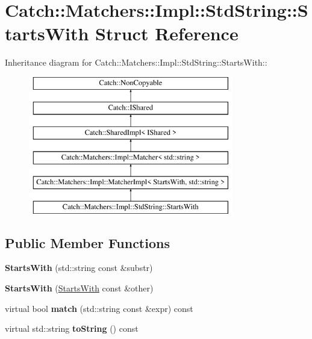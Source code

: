 \hypertarget{structCatch_1_1Matchers_1_1Impl_1_1StdString_1_1StartsWith}{
\section{Catch::Matchers::Impl::StdString::StartsWith Struct Reference}
\label{structCatch_1_1Matchers_1_1Impl_1_1StdString_1_1StartsWith}
}
Inheritance diagram for Catch::Matchers::Impl::StdString::StartsWith::\begin{figure}[H]
\begin{center}
\leavevmode
\includegraphics[height=6cm]{structCatch_1_1Matchers_1_1Impl_1_1StdString_1_1StartsWith}
\end{center}
\end{figure}
\subsection*{Public Member Functions}
\begin{DoxyCompactItemize}
\item 
\hypertarget{structCatch_1_1Matchers_1_1Impl_1_1StdString_1_1StartsWith_a1940dacb184d129adb33acea73dedc17}{
{\bfseries StartsWith} (std::string const \&substr)}
\label{structCatch_1_1Matchers_1_1Impl_1_1StdString_1_1StartsWith_a1940dacb184d129adb33acea73dedc17}

\item 
\hypertarget{structCatch_1_1Matchers_1_1Impl_1_1StdString_1_1StartsWith_a5526cb587632e7e46253d6f60ae01098}{
{\bfseries StartsWith} (\hyperlink{structCatch_1_1Matchers_1_1Impl_1_1StdString_1_1StartsWith}{StartsWith} const \&other)}
\label{structCatch_1_1Matchers_1_1Impl_1_1StdString_1_1StartsWith_a5526cb587632e7e46253d6f60ae01098}

\item 
\hypertarget{structCatch_1_1Matchers_1_1Impl_1_1StdString_1_1StartsWith_ae9c893adbacc853171a488aea5355653}{
virtual bool {\bfseries match} (std::string const \&expr) const }
\label{structCatch_1_1Matchers_1_1Impl_1_1StdString_1_1StartsWith_ae9c893adbacc853171a488aea5355653}

\item 
\hypertarget{structCatch_1_1Matchers_1_1Impl_1_1StdString_1_1StartsWith_a066fe10e74495cb556abc6895193ba97}{
virtual std::string {\bfseries toString} () const }
\label{structCatch_1_1Matchers_1_1Impl_1_1StdString_1_1StartsWith_a066fe10e74495cb556abc6895193ba97}

\end{DoxyCompactItemize}
